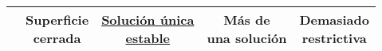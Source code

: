 \begin{landscape}
\begin{center}
\begin{tabular}{ | c | c | c | c | c |}
& \makecell{Superficie \\ cerrada} & \makecell{\underline{\textbf{Solución única}} \\ \underline{\textbf{estable}}} & \makecell{Más de \\ una solución} & \makecell{Demasiado \\ restrictiva} \\ \hline
\end{tabular}
\end{center}
\end{landscape}
